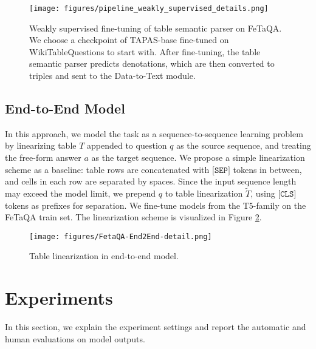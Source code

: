 \documentclass[11pt,a4paper]{article}
\newcommand{\ours}{FeTaQA\xspace}
\begin{document}
\begin{figure}[h]
  \centering
  \texttt{[image: figures/pipeline\_weakly\_supervised\_details.png]}
  \caption{Weakly supervised fine-tuning of table semantic parser on \ours. We choose a checkpoint of TAPAS-base fine-tuned on WikiTableQuestions to start with. After fine-tuning, the table semantic parser predicts denotations, which are then converted to triples and sent to the Data-to-Text module.}
  \label{fig:pipeline-finetuning-detail}
\end{figure}

\subsection{End-to-End Model}
In this approach, we model the task as a sequence-to-sequence learning problem by linearizing table $T$ appended to question $q$ as the source sequence, and treating the free-form answer $a$ as the target sequence. We propose a simple linearization scheme as a baseline: table rows are concatenated with $\texttt{[SEP]}$ tokens in between, and cells in each row are separated by spaces. Since the input sequence length may exceed the model limit, we prepend $q$ to table linearization $\widetilde{T}$, using $\texttt{[CLS]}$ tokens as prefixes for separation. We fine-tune models from the T5-family on the \ours train set. The linearization scheme is visualized in Figure \ref{fig:end2end-finetune-detail}.

\begin{figure}[h]
  \centering
  \texttt{[image: figures/FetaQA-End2End-detail.png]}
  \caption{Table linearization in end-to-end model.}
  \label{fig:end2end-finetune-detail}
\end{figure}


\section{Experiments}
In this section, we explain the experiment settings and report the automatic and human evaluations on model outputs.
\end{document}
